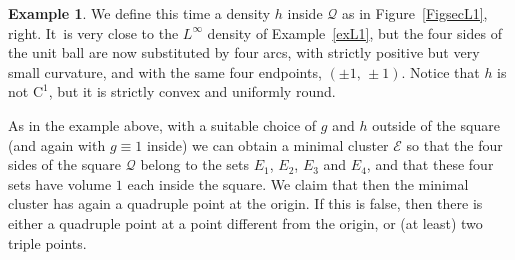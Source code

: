 \documentclass[JEP,XML,SOM,Unicode,NoFloatCountersInSection]{cedram}
\newcommand\Q{\mathcal{Q}}
\newcommand\E{\mathcal{E}}
\theoremstyle{plain}
\theoremstyle{definition}
\newtheorem{example}[thm]{Example}
\begin{document}
\begin{example}\label{exL2}
We define this time a density $h$ inside $\Q$ as in Figure~\ref{FigsecL1}, right. It~is very close to the $L^\infty$ density of Example~\ref{exL1}, but the four sides of the unit ball are now substituted by four arcs, with strictly positive but very small curvature, and with the same four endpoints, \ie $(\pm 1,\,\pm 1)$. Notice that $h$ is not $\mathrm{C}^1$, but it is strictly convex and uniformly round.

As in the example above, with a suitable choice of $g$ and $h$ outside of the square (and again with $g\equiv 1$ inside) we can obtain a minimal cluster $\E$ so that the four sides of the square $\Q$ belong to the sets $E_1$, $E_2$, $E_3$ and $E_4$, and that these four sets have volume $1$ each inside the square. We claim that then the minimal cluster has again a quadruple point at the origin. If this is false, then there is either a quadruple point at a point different from the origin, or (at least) two triple points.


\end{example}
\end{document}

